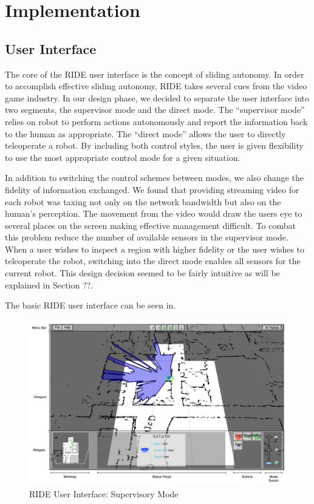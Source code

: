 \chapter{Implementation}

\section{User Interface}

The core of the RIDE user interface is the concept of sliding autonomy. In order to accomplish effective sliding autonomy, RIDE takes several cues from the video game industry. In our design phase, we decided to separate the user interface into two segments, the supervisor mode and the direct mode. The ``supervisor mode'' relies on robot to perform actions autonomously and report the information back to the human as appropriate. The ``direct mode'' allows the user to directly teleoperate a robot. By including both control styles, the user is given flexibility to use the most appropriate control mode for a given situation.

In addition to switching the control schemes between modes, we also change the fidelity of information exchanged. We found that providing streaming video for each robot was taxing not only on the network bandwidth but also on the human's perception. The movement from the video would draw the users eye to several places on the screen making effective management difficult. To combat this problem reduce the number of available sensors in the supervisor mode. When a user wishes to inspect a region with higher fidelity or the user wishes to teleoperate the robot, switching into the direct mode enables all sensors for the current robot. This design decision seemed to be fairly intuitive as will be explained in Section ??.

The basic RIDE user interface can be seen in.
\begin{figure}[ht]
\begin{center}
\includegraphics[width=6.10in]{images/ride-ui.pdf}
\caption{RIDE User Interface: Supervisory Mode\label{fig:ride-ui}}
\end{center}
\end{figure}


